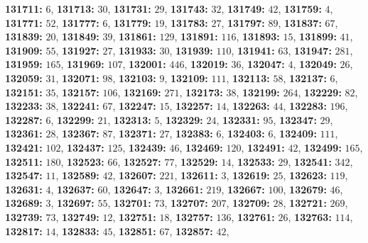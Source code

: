 \textsf{\bfseries 131711:} $6$, \textsf{\bfseries 131713:} $30$, \textsf{\bfseries 131731:} $29$, \textsf{\bfseries 131743:} $32$, \textsf{\bfseries 131749:} $42$, \textsf{\bfseries 131759:} $4$, \textsf{\bfseries 131771:} $52$, \textsf{\bfseries 131777:} $6$, \textsf{\bfseries 131779:} $19$, \textsf{\bfseries 131783:} $27$, \textsf{\bfseries 131797:} $89$, \textsf{\bfseries 131837:} $67$, \textsf{\bfseries 131839:} $20$, \textsf{\bfseries 131849:} $39$, \textsf{\bfseries 131861:} $129$, \textsf{\bfseries 131891:} $116$, \textsf{\bfseries 131893:} $15$, \textsf{\bfseries 131899:} $41$, \textsf{\bfseries 131909:} $55$, \textsf{\bfseries 131927:} $27$, \textsf{\bfseries 131933:} $30$, \textsf{\bfseries 131939:} $110$, \textsf{\bfseries 131941:} $63$, \textsf{\bfseries 131947:} $281$, \textsf{\bfseries 131959:} $165$, \textsf{\bfseries 131969:} $107$, \textsf{\bfseries 132001:} $446$, \textsf{\bfseries 132019:} $36$, \textsf{\bfseries 132047:} $4$, \textsf{\bfseries 132049:} $26$, \textsf{\bfseries 132059:} $31$, \textsf{\bfseries 132071:} $98$, \textsf{\bfseries 132103:} $9$, \textsf{\bfseries 132109:} $111$, \textsf{\bfseries 132113:} $58$, \textsf{\bfseries 132137:} $6$, \textsf{\bfseries 132151:} $35$, \textsf{\bfseries 132157:} $106$, \textsf{\bfseries 132169:} $271$, \textsf{\bfseries 132173:} $38$, \textsf{\bfseries 132199:} $264$, \textsf{\bfseries 132229:} $82$, \textsf{\bfseries 132233:} $38$, \textsf{\bfseries 132241:} $67$, \textsf{\bfseries 132247:} $15$, \textsf{\bfseries 132257:} $14$, \textsf{\bfseries 132263:} $44$, \textsf{\bfseries 132283:} $196$, \textsf{\bfseries 132287:} $6$, \textsf{\bfseries 132299:} $21$, \textsf{\bfseries 132313:} $5$, \textsf{\bfseries 132329:} $24$, \textsf{\bfseries 132331:} $95$, \textsf{\bfseries 132347:} $29$, \textsf{\bfseries 132361:} $28$, \textsf{\bfseries 132367:} $87$, \textsf{\bfseries 132371:} $27$, \textsf{\bfseries 132383:} $6$, \textsf{\bfseries 132403:} $6$, \textsf{\bfseries 132409:} $111$, \textsf{\bfseries 132421:} $102$, \textsf{\bfseries 132437:} $125$, \textsf{\bfseries 132439:} $46$, \textsf{\bfseries 132469:} $120$, \textsf{\bfseries 132491:} $42$, \textsf{\bfseries 132499:} $165$, \textsf{\bfseries 132511:} $180$, \textsf{\bfseries 132523:} $66$, \textsf{\bfseries 132527:} $77$, \textsf{\bfseries 132529:} $14$, \textsf{\bfseries 132533:} $29$, \textsf{\bfseries 132541:} $342$, \textsf{\bfseries 132547:} $11$, \textsf{\bfseries 132589:} $42$, \textsf{\bfseries 132607:} $221$, \textsf{\bfseries 132611:} $3$, \textsf{\bfseries 132619:} $25$, \textsf{\bfseries 132623:} $119$, \textsf{\bfseries 132631:} $4$, \textsf{\bfseries 132637:} $60$, \textsf{\bfseries 132647:} $3$, \textsf{\bfseries 132661:} $219$, \textsf{\bfseries 132667:} $100$, \textsf{\bfseries 132679:} $46$, \textsf{\bfseries 132689:} $3$, \textsf{\bfseries 132697:} $55$, \textsf{\bfseries 132701:} $73$, \textsf{\bfseries 132707:} $207$, \textsf{\bfseries 132709:} $28$, \textsf{\bfseries 132721:} $269$, \textsf{\bfseries 132739:} $73$, \textsf{\bfseries 132749:} $12$, \textsf{\bfseries 132751:} $18$, \textsf{\bfseries 132757:} $136$, \textsf{\bfseries 132761:} $26$, \textsf{\bfseries 132763:} $114$, \textsf{\bfseries 132817:} $14$, \textsf{\bfseries 132833:} $45$, \textsf{\bfseries 132851:} $67$, \textsf{\bfseries 132857:} $42$, 

